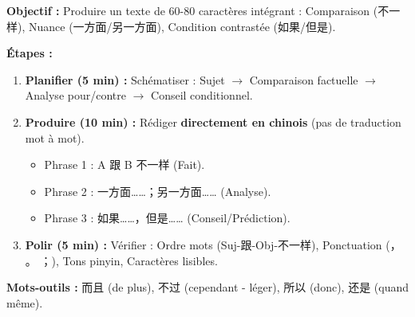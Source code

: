 \documentclass[11pt]{article}
\newcommand{\cle}[1]{{\popxbold\color{popdark}#1}}
\begin{document}
\begin{methode}
\textbf{Objectif :} Produire un texte de 60-80 caractères intégrant : Comparaison (\cle{不一样}), Nuance (\cle{一方面/另一方面}), Condition contrastée (\cle{如果/但是}).

\textbf{Étapes :}
\begin{enumerate}
    \item \textbf{Planifier (5 min) :} Schématiser : Sujet $\rightarrow$ Comparaison factuelle $\rightarrow$ Analyse pour/contre $\rightarrow$ Conseil conditionnel.
    \item \textbf{Produire (10 min) :} Rédiger \textbf{directement en chinois} (pas de traduction mot à mot).
        \begin{itemize}
            \item Phrase 1 : \cle{A 跟 B 不一样} (Fait).
            \item Phrase 2 : \cle{一方面……；另一方面……} (Analyse).
            \item Phrase 3 : \cle{如果……，但是……} (Conseil/Prédiction).
        \end{itemize}
    \item \textbf{Polir (5 min) :} Vérifier : Ordre mots (Suj-\cle{跟}-Obj-\cle{不一样}), Ponctuation (， 。 ；), Tons pinyin, Caractères lisibles.
\end{enumerate}
\textbf{Mots-outils :} \cle{而且} (de plus), \cle{不过} (cependant - léger), \cle{所以} (donc), \cle{还是} (quand même).
\end{methode}
\end{document}
